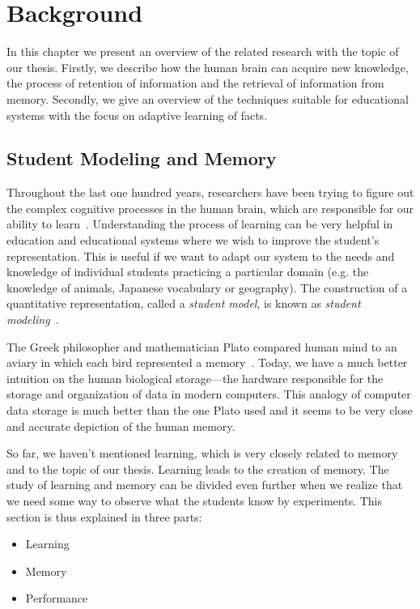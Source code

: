 \chapter{Background}

In this chapter we present an overview of the related research with the topic of our thesis. Firstly, we describe how the human brain can acquire new knowledge, the process of retention of information and the retrieval of information from memory. Secondly, we give an overview of the techniques suitable for educational systems with the focus on adaptive learning of facts.

\section{Student Modeling and Memory}

Throughout the last one hundred years, researchers have been trying to figure out the complex cognitive processes in the human brain, which are responsible for our ability to learn~\cite{RichardE.Mayer2010}. Understanding the process of learning can be very helpful in education and educational systems where we wish to improve the student's representation. This is useful if we want to adapt our system to the needs and knowledge of individual students practicing a particular domain (e.g. the knowledge of animals, Japanese vocabulary or geography). The construction of a quantitative representation, called a \textit{student model}, is known as \textit{student modeling}~\cite{Sison1998}.

The Greek philosopher and mathematician Plato compared human mind to an aviary in which each bird represented a memory~\cite{MichaelW.Eysenck2008}. Today, we have a much better intuition on the human biological storage---the hardware responsible for the storage and organization of data in modern computers. This analogy of computer data storage is much better than the one Plato used and it seems to be very close and accurate depiction of the human memory.

So far, we haven't mentioned learning, which is very closely related to memory and to the topic of our thesis. Learning leads to the creation of memory. The study of learning and memory can be divided even further when we realize that we need some way to observe what the students know by experiments. This section is thus explained in three parts:

\begin{itemize}
  \item Learning
  \item Memory
  \item Performance
\end{itemize}

